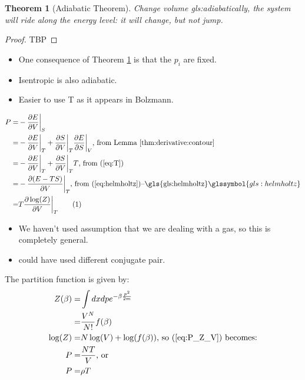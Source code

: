 \documentclass[]{article}
\newcommand\numberthis{\addtocounter{equation}{1}\tag{\theequation}}
\newtheorem{thm}{Theorem}
\begin{document}
\begin{thm}[Adiabatic Theorem]\label{thm:adiabatic}
	Change volume \gls{gls:adiabatic}ally, the system will ride along the energy level: it will change, but not jump.
\end{thm}

\begin{proof}
	TBP
\end{proof}
\begin{itemize}
	\item One consequence of Theorem \ref{thm:adiabatic} is that the $p_i$ are fixed.
	
	\item Isentropic is also adiabatic.
	
	\item Easier to use T as it appears in Bolzmann.
\end{itemize}

\begin{align*}
P =& - \frac{\partial E}{\partial V}\bigg|_S \\
=& - \frac{\partial E}{\partial V}\bigg|_T + \frac{\partial S}{\partial V}\bigg|_T \frac{\partial E}{\partial S}\bigg|_V\text{, from Lemma \ref{thm:derivative:contour}}\\
=& - \frac{\partial E}{\partial V}\bigg|_T + \frac{\partial S}{\partial V}\bigg|_T T\text{, from (\ref{eq:T})}\\
=& - \frac{\partial(E-TS)}{\partial V}\bigg|_T \text{, from (\ref{eq:helmholtz})--\gls{gls:helmholtz}} \glssymbol{gls:helmholtz}\\
=& T \frac{\partial \log(Z)}{\partial V}\bigg|_T \numberthis \label{eq:P_Z_V}
\end{align*}

\begin{itemize}
	\item We haven't used assumption that we are dealing with a gas, so this is completely general.
	\item could have used different conjugate pair.
\end{itemize}

The partition function is given by:
\begin{align*}
Z(\beta) =& \int dx dp e^{- \beta \frac{p^2}{2m}}\\
=& \frac{V^N}{N!} f(\beta)\\
\log(Z) =& N \log(V) + \log(f(\beta))\text{, so (\ref{eq:P_Z_V})  becomes:}\\
P =& \frac{NT}{V}\text{, or}\\
P =& \rho T
\end{align*}
\end{document}
